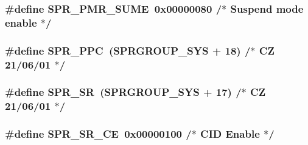 \hypertarget{spr-defs_8h_af852d0db197465cf9ae3878173b76c0a}{
\subsubsection[{\-S\-P\-R\-\_\-\-P\-M\-R\-\_\-\-S\-U\-M\-E}]{\setlength{\rightskip}{0pt plus 5cm}\#define {\bf \-S\-P\-R\-\_\-\-P\-M\-R\-\_\-\-S\-U\-M\-E}~0x00000080  /$\ast$ Suspend mode enable $\ast$/}}\label{spr-defs_8h_af852d0db197465cf9ae3878173b76c0a}
\hypertarget{spr-defs_8h_ab0664a45fdaf01fcf6dc864965c4c4c6}{
\subsubsection[{\-S\-P\-R\-\_\-\-P\-P\-C}]{\setlength{\rightskip}{0pt plus 5cm}\#define {\bf \-S\-P\-R\-\_\-\-P\-P\-C}~({\bf \-S\-P\-R\-G\-R\-O\-U\-P\-\_\-\-S\-Y\-S} + 18)  /$\ast$ \-C\-Z 21/06/01 $\ast$/}}\label{spr-defs_8h_ab0664a45fdaf01fcf6dc864965c4c4c6}
\hypertarget{spr-defs_8h_a4580bfb89115ee6be7947e9ee7b59ba0}{
\subsubsection[{\-S\-P\-R\-\_\-\-S\-R}]{\setlength{\rightskip}{0pt plus 5cm}\#define {\bf \-S\-P\-R\-\_\-\-S\-R}~({\bf \-S\-P\-R\-G\-R\-O\-U\-P\-\_\-\-S\-Y\-S} + 17)  /$\ast$ \-C\-Z 21/06/01 $\ast$/}}\label{spr-defs_8h_a4580bfb89115ee6be7947e9ee7b59ba0}
\hypertarget{spr-defs_8h_a16c22879b4a391f46a49eb633518887f}{
\subsubsection[{\-S\-P\-R\-\_\-\-S\-R\-\_\-\-C\-E}]{\setlength{\rightskip}{0pt plus 5cm}\#define {\bf \-S\-P\-R\-\_\-\-S\-R\-\_\-\-C\-E}~0x00000100  /$\ast$ C\-I\-D Enable $\ast$/}}\label{spr-defs_8h_a16c22879b4a391f46a49eb633518887f}
